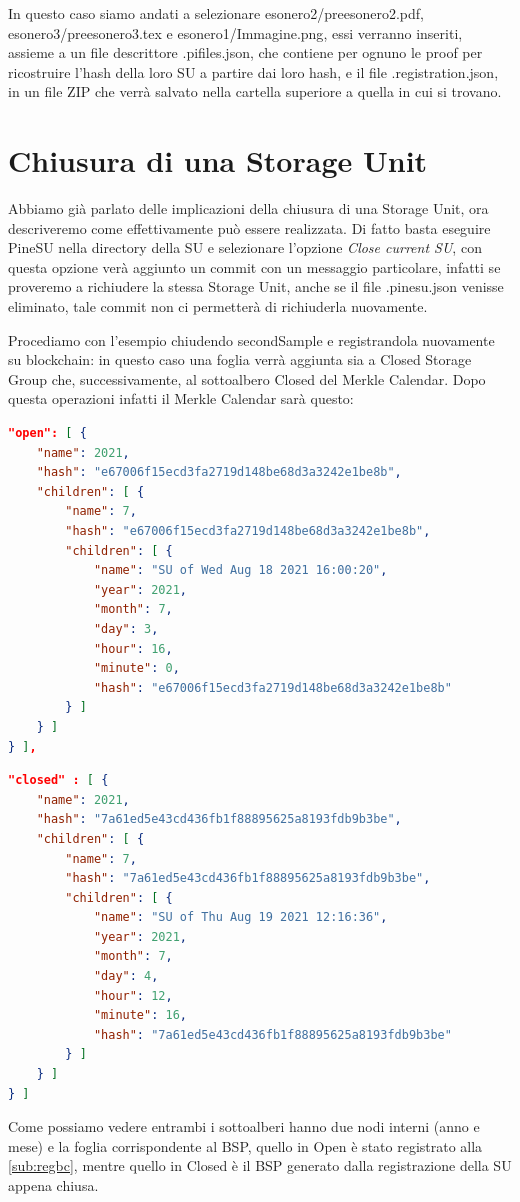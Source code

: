 In questo caso siamo andati a selezionare \textsf{esonero2/preesonero2.pdf},
\textsf{esonero3/preesonero3.tex} e \textsf{esonero1/Immagine.png}, essi verranno inseriti,
assieme a un file descrittore \textsf{.pifiles.json}, che contiene per ognuno le proof
per ricostruire l’hash della loro SU a partire dai loro hash, e il file \textsf{.registration.json},
in un file ZIP che verrà salvato nella cartella superiore a quella in cui si trovano.

\newpage

\section{Chiusura di una Storage Unit}
Abbiamo già parlato delle implicazioni della chiusura di una Storage Unit, ora descriveremo come
effettivamente può essere realizzata. Di fatto basta eseguire PineSU nella directory della SU e
selezionare l’opzione \emph{Close current SU}, con questa opzione verà aggiunto un commit con un
messaggio particolare, infatti se proveremo a richiudere la stessa Storage Unit, anche se
il file \textsf{.pinesu.json} venisse eliminato, tale commit non ci permetterà di richiuderla
nuovamente.

Procediamo con l’esempio chiudendo \textsf{secondSample} e registrandola nuovamente
su blockchain: in questo caso una foglia verrà aggiunta sia a Closed Storage Group che,
successivamente, al sottoalbero Closed del Merkle Calendar.
Dopo questa operazioni infatti il Merkle Calendar sarà questo:


\singlespacing
\begin{lstlisting}[language=json,firstnumber=1,basicstyle=\small]
"open": [ {
    "name": 2021,
    "hash": "e67006f15ecd3fa2719d148be68d3a3242e1be8b",
    "children": [ {
        "name": 7,
        "hash": "e67006f15ecd3fa2719d148be68d3a3242e1be8b",
        "children": [ {
            "name": "SU of Wed Aug 18 2021 16:00:20",
            "year": 2021,
            "month": 7,
            "day": 3,
            "hour": 16,
            "minute": 0,
            "hash": "e67006f15ecd3fa2719d148be68d3a3242e1be8b"
        } ]
    } ]
} ],
\end{lstlisting}
\newpage\begin{lstlisting}[language=json,firstnumber=18,basicstyle=\small]
"closed" : [ {
    "name": 2021,
    "hash": "7a61ed5e43cd436fb1f88895625a8193fdb9b3be",
    "children": [ {
        "name": 7,
        "hash": "7a61ed5e43cd436fb1f88895625a8193fdb9b3be",
        "children": [ {
            "name": "SU of Thu Aug 19 2021 12:16:36",
            "year": 2021,
            "month": 7,
            "day": 4,
            "hour": 12,
            "minute": 16,
            "hash": "7a61ed5e43cd436fb1f88895625a8193fdb9b3be"
        } ]
    } ]
} ]  
\end{lstlisting}
\onehalfspacing
Come possiamo vedere entrambi i sottoalberi hanno due nodi interni (anno e mese) e la foglia
corrispondente al BSP, quello in Open è stato registrato alla \autoref{sub:regbc}, mentre quello
in Closed è il BSP generato dalla registrazione della SU appena chiusa.

